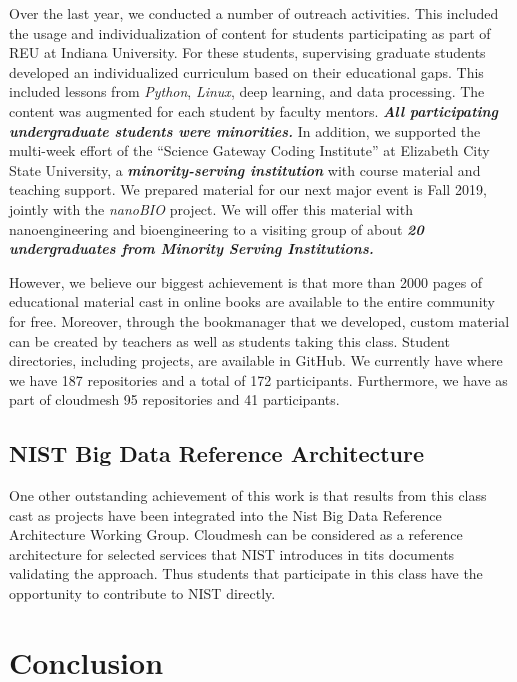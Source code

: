 \documentclass[conference]{IEEEtran}
\begin{document}
Over the last year, we conducted a number of outreach activities.
This included the usage and individualization of content for students
participating as part of REU at Indiana University. For these students,
supervising graduate students developed an individualized curriculum
based on their educational gaps. This included lessons from
\emph{Python}, \emph{Linux}, deep learning, and data processing. The
content was augmented for each student by faculty mentors.
\emph{\textbf{All participating undergraduate students were
minorities.}} In addition, we supported the multi-week effort of the ``Science Gateway
Coding Institute'' at Elizabeth City State University, a
\emph{\textbf{minority-serving institution}} with course material and
teaching support. We prepared material for our next major event is Fall 2019, jointly with
the \emph{nanoBIO} project. We will offer this material with
nanoengineering and bioengineering to a visiting group of about
\emph{\textbf{20 undergraduates from Minority Serving Institutions.}}

However, we believe our biggest achievement is that more than 2000
pages of educational material cast in online books are available to the
entire community for free. Moreover, through the bookmanager that we
developed, custom material can be created by teachers as well as
students taking this class. Student directories, including projects, are
available in GitHub. We currently have where we have 187 repositories
and a total of 172 participants. Furthermore, we have as part of
cloudmesh 95 repositories and 41 participants.

\subsection{NIST Big Data Reference Architecture}

One other outstanding achievement of this work is that results from
this class cast as projects have been integrated into the Nist Big Data
Reference Architecture Working Group. Cloudmesh can be considered as a
reference architecture for selected services that NIST introduces in
tits documents validating the approach. Thus students that participate
in this class have the opportunity to contribute to NIST
\cite{nist-bigdata,nist-vol8} directly.

\section{Conclusion}
\end{document}
